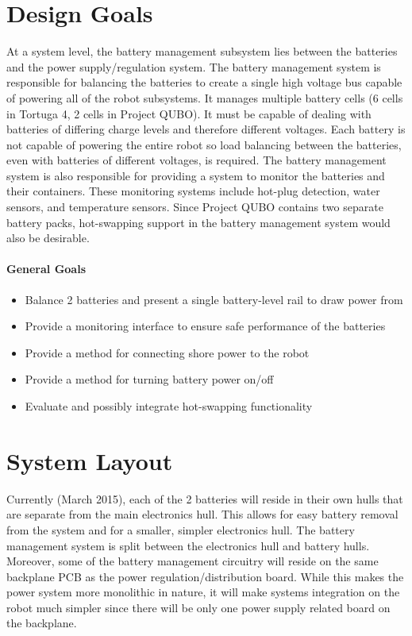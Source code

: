 \documentclass[12pt, letterpaper]{article}
\begin{document}
	\section{Design Goals}
		At a system level, the battery management subsystem lies between the batteries and the power supply/regulation system. The battery management system is responsible for balancing the batteries to create a single high voltage bus capable of powering all of the robot subsystems. It manages multiple battery cells (6 cells in Tortuga 4, 2 cells in Project QUBO). It must be capable of dealing with batteries of differing charge levels and therefore different voltages. Each battery is not capable of powering the entire robot so load balancing between the batteries, even with batteries of different voltages, is required. The battery management system is also responsible for providing a system to monitor the batteries and their containers. These monitoring systems include hot-plug detection, water sensors, and temperature sensors. Since Project QUBO contains two separate battery packs, hot-swapping support in the battery management system would also be desirable.
		
		\paragraph{General Goals}
		\begin{itemize}
			\item Balance 2 batteries and present a single battery-level rail to draw power from
			\item Provide a monitoring interface to ensure safe performance of the batteries
			\item Provide a method for connecting shore power to the robot
			\item Provide a method for turning battery power on/off
			\item Evaluate and possibly integrate hot-swapping functionality
		\end{itemize}
		
	\section{System Layout}
		
		Currently (March 2015), each of the 2 batteries will reside in their own hulls that are separate from the main electronics hull. This allows for easy battery removal from the system and for a smaller, simpler electronics hull. The battery management system is split between the electronics hull and battery hulls. Moreover, some of the battery management circuitry will reside on the same backplane PCB as the power regulation/distribution board. While this makes the power system more monolithic in nature, it will make systems integration on the robot much simpler since there will be only one power supply related board on the backplane.
		
\end{document}
